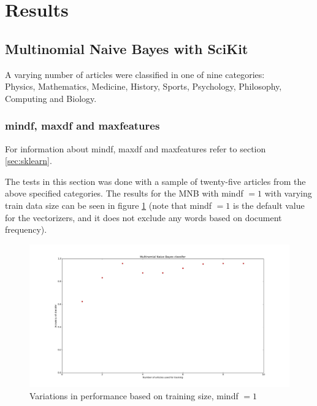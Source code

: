 \documentclass[a4paper,10pt]{article}
\begin{document}
\section{Results}

\subsection{Multinomial Naive Bayes with SciKit}

A varying number of articles were classified in one of nine categories: \\
Physics, Mathematics, Medicine, History, Sports, Psychology, Philosophy, Computing and Biology.\\
\subsubsection{min\textunderscore df, max\textunderscore df and max\textunderscore features}
\label{sec:parameters}
For information about min\textunderscore df, max\textunderscore df and max\textunderscore features refer to section \ref{sec:sklearn}.

\noindent The tests in this section was done with a sample of twenty-five articles from the above specified categories.
\noindent The results for the MNB with min\textunderscore df $= 1$ with varying train data size can be seen in figure \ref{fig:MNB_first} (note that min\textunderscore df $= 1$ is the default value for the vectorizers, and it does not exclude any words based on document frequency). 
\begin{figure}[h!]
  \centering
    \includegraphics[width=1.0\textwidth]{MNB_first}
  \caption{Variations in performance based on training size, min\textunderscore df $ = 1$}
  \label{fig:MNB_first}
\end{figure}
\vspace{3mm}
\end{document}
